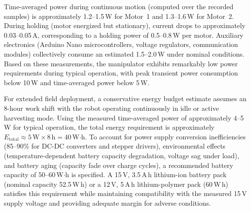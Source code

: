 Time-averaged power during continuous motion (computed over the recorded samples) is approximately 1.2--1.5\,W for Motor~1 and 
1.3--1.6\,W for Motor~2. During holding (motor energized but stationary), current drops to approximately 0.03--0.05\,A, 
corresponding to a holding power of 0.5--0.8\,W per motor. Auxiliary electronics (Arduino Nano microcontrollers, voltage regulators, 
communication modules) collectively consume an estimated 1.5--2.0\,W under nominal conditions. Based on these measurements, the 
manipulator exhibits remarkably low power requirements during typical operation, with peak transient power consumption below 10\,W 
and time-averaged power below 5\,W.

For extended field deployment, a conservative energy budget estimate assumes an 8-hour work shift with the robot operating 
continuously in idle or active harvesting mode. Using the measured time-averaged power of approximately 4--5\,W for typical operation, 
the total energy requirement is approximately $E_{\mathrm{total}} \approx 5\,\mathrm{W} \times 8\,\mathrm{h} = 40$\,W$\cdot$h. To account 
for power supply conversion inefficiencies (85--90\% for DC-DC converters and stepper drivers), environmental effects (temperature-dependent 
battery capacity degradation, voltage sag under load), and battery aging (capacity fade over charge cycles), a recommended battery capacity 
of 50--60\,W$\cdot$h is specified. A 15\,V, 3.5\,A\,h lithium-ion battery pack (nominal capacity 52.5\,W\,h) or a 12\,V, 5\,A\,h 
lithium-polymer pack (60\,W\,h) satisfies this requirement while maintaining compatibility with the measured 15\,V supply voltage and 
providing adequate margin for adverse conditions.

